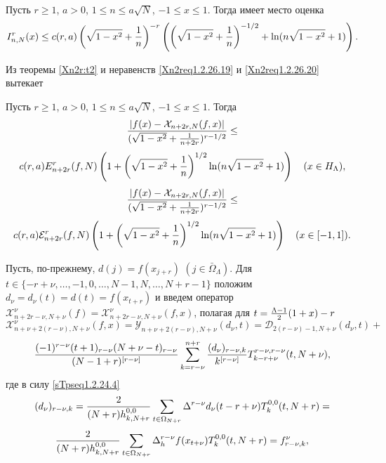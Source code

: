 \begin{theorem}\label{Xn2r:t2} Пусть $r\ge 1$, $a>0$, $1\le n\le a\sqrt{N}
$, $-1\le x \le1$. Тогда имеет место оценка
$$
I_{n,N}^r(x)\le
c(r,a)\left(\sqrt{1-x^2}+{1\over
n}\right)^{-r}\left(\left(\sqrt{1-x^2}+\frac1n\right)^{-1/2}+\ln(n\sqrt{1-x^2}+1)\right).
$$
\end{theorem}
Из теоремы \ref{Xn2r:t2} и неравенств \eqref{Xn2req1.2.26.19} и \eqref{Xn2req1.2.26.20} вытекает

\begin{corollary}\label{Xn2r:col1} Пусть $r\ge 1$, $a>0$, $1\le n\le
a\sqrt{N} $, $-1\le x \le1$. Тогда
$${|f(x)-\mathcal{X}_{n+2r,N}(f,x)|\over(\sqrt{1-x^2}+{1\over n+2r})^{r-1/2}}\le
$$
\begin{equation}\label{Xn2req1.2.26.22}
 c(r,a)E_{n+2r}^r(f,N)\left(1 + \left(\sqrt{1-x^2}+{1\over
n}\right)^{1/2}\ln(n\sqrt{1-x^2}+1)\right) \quad (x\in
H_\Lambda),
\end{equation}
 $$
 {|f(x)-\mathcal{X}_{n+2r,N}(f,x)|\over(\sqrt{1-x^2}+{1\over n+2r})^{r-1/2}}\le
$$
\begin{equation}
\label{Xn2req1.2.26.23}
c(r,a)\mathcal{E}_{n+2r}^r(f,N)\left(1 + \left(\sqrt{1-x^2}+{1\over
n}\right)^{1/2}\ln(n\sqrt{1-x^2}+1)\right) \quad (x\in [-1,1]).
\end{equation}
\end{corollary}

Пусть, по-прежнему,  $d(j)=f(x_{j+r})$ $(j\in \bar \Omega_\Lambda)$.  Для $t\in \{-r+\nu,\ldots,-1,0,\ldots,N-1,N,\ldots,N+r-1\}$ положим $d_\nu=d_\nu(t)=d(t)=f(x_{t+r})$ и введем оператор $\mathcal{X}^\nu_{n+2r-\nu,N+\nu}(f)=\mathcal{X}^\nu_{n+2r-\nu,N+\nu}(f,x)$, полагая для
 $ t={\Lambda-1\over2}(1+x)-r$
$$
\mathcal{X}^\nu_{n+\nu+2(r-\nu),N+\nu}(f,x)=\mathcal{Y}_{n+\nu+2(r-\nu),N+\nu}(d_\nu,t)=
\mathcal{D}_{2(r-\nu)-1,N+\nu}(d_\nu,t)+
$$
\begin{equation}\label{Xn2req1.2.26.24}
{(-1)^{r-\nu}(t+1)_{r-\nu}(N+\nu-t)_{r-\nu}\over (N-1+r)^{[r-\nu]}}
\sum_{k=r-\nu}^{n+r} {(d_\nu)_{r-\nu,k}\over k^{[r-\nu]}}
T_{k-r+\nu}^{r-\nu,r-\nu}(t,N+\nu),
\end{equation}
где в силу \eqref{sTpseq1.2.24.4}
$$
 (d_\nu)_{r-\nu,k}    ={2\over (N+r)h_{k,N+r}^{0,0}}
     \sum_{t\in\Omega_{N+r}}\Delta^{r-\nu}d_\nu(t-r+\nu)T_k^{0,0}(t,N+r)=
    $$
     \begin{equation}\label{Xn2req1.2.26.25}
     {2\over (N+r)h_{k,N+r}^{0,0}}
     \sum_{t\in\Omega_{N+r}}\Delta^{r-\nu}_hf(x_{t+\nu})T_k^{0,0}(t,N+r)=f^\nu_{r-\nu,k},
    \end{equation}

